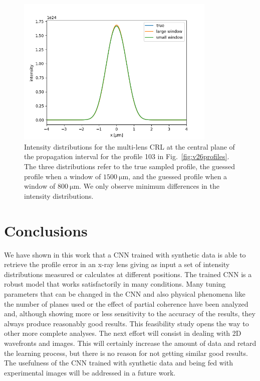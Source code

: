 \documentclass{iucr}
\begin{document}
\begin{figure}\label{fig:figure8}
\includegraphics[width=0.85\textwidth]{figures/figure8.png}

\caption{
Intensity distributions for the multi-lens CRL at the central plane of the propagation interval for the profile 103 in Fig.~\ref{fig:v26profiles}. The three distributions refer to the true sampled profile, the guessed profile when a window of $\SI{1500}{\micro\meter}$, and the guessed profile when a window of $\SI{800}{\micro\meter}$. We only observe  minimum differences in the intensity distributions.
    }
\end{figure}

\section{Conclusions}\label{sec:conclusions}

We have shown in this work that a CNN trained with synthetic data is able to retrieve the profile error in an x-ray lens giving as input a set of intensity distributions measured or calculates at different positions. The trained CNN is a robust model that works satisfactorily in many conditions. Many tuning parameters that can be changed in the CNN and also physical phenomena like the number of planes used or the effect of partial coherence have been analyzed and, although showing more or less sensitivity to the accuracy of the results, they always produce reasonably good results. This feasibility study opens the way to other more complete analyses. The next effort will consist in dealing with 2D wavefronts and images. This will certainly increase the amount of data and retard the learning process, but there is no reason for not getting similar good results. The usefulness of the CNN trained with synthetic data and being fed with  experimental images will be addressed in a future work.  
\end{document}
